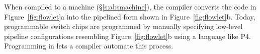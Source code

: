 When compiled to a \absmachine machine (\S\ref{s:absmachine}), the \pktlanguage
compiler converts the code in Figure~\ref{fig:flowlet}a into the pipelined form
shown in Figure~\ref{fig:flowlet}b. Today, programmable switch chips are
programmed by manually specifying low-level pipeline configurations resembling
Figure~\ref{fig:flowlet}b using a language like P4. Programming in \pktlanguage
lets a compiler automate this process.
